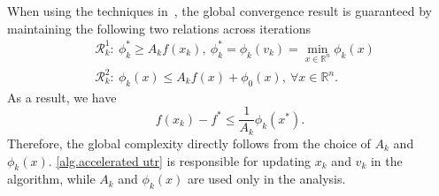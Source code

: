 \documentclass{article}
\begin{document}
When using the techniques in~\cite{nesterov2008accelerating}, the global convergence result is guaranteed by maintaining the following two relations across iterations
\begin{subequations}\label{eq.es relation}
\begin{align}
    \label{eq.es relation 1}
     & \mathcal{R}_k^1: \ \phi_k^*  \geq A_k f(x_k), \  \phi_k^*= \phi_k(v_k) =\min_{x\in\mathbb{R}^n}\phi_k(x) \\
    \label{eq.es relation 2}
     & \mathcal{R}_k^2: \ \phi_k(x)\leq A_kf(x)+\phi_0(x), \ \forall x\in\mathbb{R}^n.
\end{align}
\end{subequations}
As a result, we have
\begin{equation*}
    f(x_k)-f^*\leq \frac{1}{A_k}\phi_k(x^*).
\end{equation*}
Therefore, the global complexity directly follows from the choice of $A_k$ and $\phi_k(x)$. \autoref{alg.accelerated utr} is responsible for updating $x_k$ and $v_k$ in the algorithm, while $A_k$ and $\phi_k(x)$ are used only in the analysis.
\end{document}
